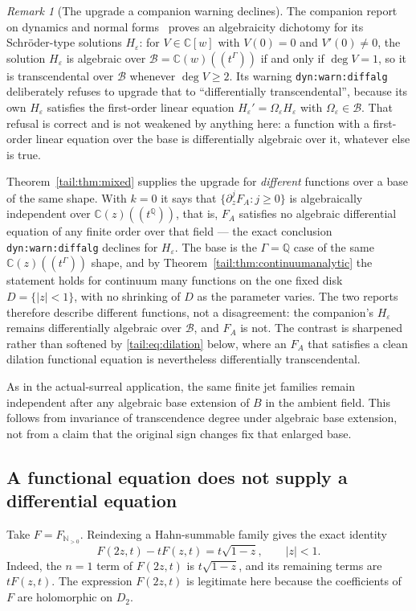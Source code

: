 \documentclass[11pt,a4paper]{article}
\numberwithin{equation}{section}
\theoremstyle{definition}
\theoremstyle{remark}
\newtheorem{remark}[theorem]{Remark}
\newcommand{\C}{\mathbb C}
\newcommand{\Q}{\mathbb Q}
\newcommand{\N}{\mathbb N}
\begin{document}
\begin{remark}[The upgrade a companion warning declines]
\label{tail:rem:dynupgrade}
The companion report on dynamics and normal forms~\cite{RepoDyn} proves
an algebraicity dichotomy for its Schr\"oder-type solutions
$H_\varepsilon$: for $V\in\C[w]$ with $V(0)=0$ and $V'(0)\neq0$, the
solution $H_\varepsilon$ is algebraic over
$\mathscr B=\C(w)((t^\Gamma))$ if and only if $\deg V=1$, so it is
transcendental over $\mathscr B$ whenever $\deg V\geq2$.
Its warning \texttt{dyn:warn:diffalg}
deliberately refuses to upgrade that to ``differentially
transcendental'', because its own $H_\varepsilon$ satisfies the first-order
linear equation $H_\varepsilon'=\Omega_\varepsilon H_\varepsilon$ with $\Omega_\varepsilon\in\mathscr B$.
That refusal is correct and is not weakened by anything here: a function
with a first-order linear equation over the base is differentially
algebraic over it, whatever else is true.

Theorem~\ref{tail:thm:mixed} supplies the upgrade for \emph{different}
functions over a base of the same shape. With $k=0$ it says that
$\{\partial_z^jF_A:j\geq0\}$ is algebraically independent over
$\C(z)((t^\Q))$, that is, $F_A$ satisfies no algebraic differential
equation of any finite order over that field --- the exact conclusion
\texttt{dyn:warn:diffalg} declines for $H_\varepsilon$. The base is the
$\Gamma=\Q$ case of the same $\C(z)((t^\Gamma))$ shape, and by
Theorem~\ref{tail:thm:continuumanalytic} the statement holds for
continuum many functions on the one fixed disk $D=\{|z|<1\}$, with no
shrinking of $D$ as the parameter varies. The two reports therefore
describe different functions, not a disagreement: the companion's
$H_\varepsilon$ remains differentially algebraic over $\mathscr B$, and $F_A$ is not.
The contrast is sharpened rather than softened by
\eqref{tail:eq:dilation} below, where an $F_A$ that satisfies a clean
dilation functional equation is nevertheless differentially
transcendental.
\end{remark}

As in the actual-surreal application, the same finite jet families remain
independent after any algebraic base extension of $B$ in the ambient
field. This follows from invariance of transcendence degree under
algebraic base extension, not from a claim that the original sign
changes fix that enlarged base.

\subsection{A functional equation does not supply a differential equation}
Take $F=F_{\N_{>0}}$. Reindexing a Hahn-summable family gives the exact
identity
\begin{equation}\label{tail:eq:dilation}
 F(2z,t)-tF(z,t)=t\sqrt{1-z},\qquad |z|<1.
\end{equation}
Indeed, the $n=1$ term of $F(2z,t)$ is $t\sqrt{1-z}$, and its remaining
terms are $tF(z,t)$. The expression $F(2z,t)$ is legitimate here because
the coefficients of $F$ are holomorphic on $D_2$.
\end{document}
